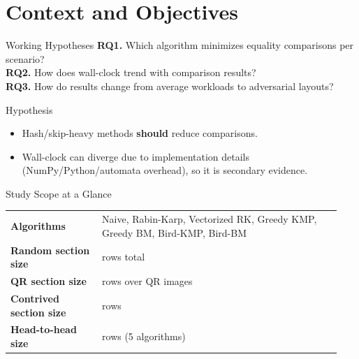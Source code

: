 \section{Context and Objectives}

\begin{frame}{Working Hypotheses}
\textbf{RQ1.} Which algorithm minimizes equality comparisons per scenario?\\
\textbf{RQ2.} How does wall-clock trend with comparison results?\\
\textbf{RQ3.} How do results change from average workloads to adversarial layouts?

\vspace{0.5em}
\begin{block}{Hypothesis}
\begin{itemize}
  \item Hash/skip-heavy methods \textbf{should} reduce comparisons.
  \item Wall-clock can diverge due to implementation details (NumPy/Python/automata overhead), so it is secondary evidence.
\end{itemize}
\end{block}
\end{frame}

\begin{frame}{Study Scope at a Glance}
\small
\begin{tabular}{>{\bfseries}p{0.26\linewidth}p{0.68\linewidth}}
Algorithms & Naive, Rabin-Karp, Vectorized RK, Greedy KMP, Greedy BM, Bird-KMP, Bird-BM \\
Random section size & \RandomRowCount{} rows total \\
QR section size & \QrRowCount{} rows over \QrImageCount{} QR images \\
Contrived section size & \ContrivedRowCount{} rows \\
Head-to-head size & \HeadToHeadRowCount{} rows (5 algorithms) \\
\end{tabular}

\vspace{0.6em}
\end{frame}

